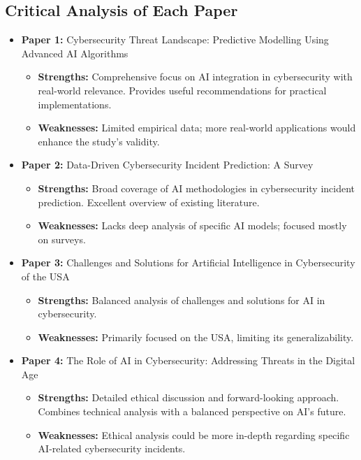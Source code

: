 \documentclass[12pt,a4paper]{article}
\begin{document}
\subsection{Critical Analysis of Each Paper}
\begin{itemize}
    \item \textbf{Paper 1:} Cybersecurity Threat Landscape: Predictive Modelling Using Advanced AI Algorithms \cite{Maddireddy2022}
    \begin{itemize}
        \item \textbf{Strengths:} Comprehensive focus on AI integration in cybersecurity with real-world relevance. Provides useful recommendations for practical implementations.
        \item \textbf{Weaknesses:} Limited empirical data; more real-world applications would enhance the study's validity.
    \end{itemize}
    
    \item \textbf{Paper 2:} Data-Driven Cybersecurity Incident Prediction: A Survey \cite{Sun2019}
    \begin{itemize}
        \item \textbf{Strengths:} Broad coverage of AI methodologies in cybersecurity incident prediction. Excellent overview of existing literature.
        \item \textbf{Weaknesses:} Lacks deep analysis of specific AI models; focused mostly on surveys.
    \end{itemize}

    \item \textbf{Paper 3:} Challenges and Solutions for Artificial Intelligence in Cybersecurity of the USA \cite{Soni2020}
    \begin{itemize}
        \item \textbf{Strengths:} Balanced analysis of challenges and solutions for AI in cybersecurity.
        \item \textbf{Weaknesses:} Primarily focused on the USA, limiting its generalizability.
    \end{itemize}
    
    \item \textbf{Paper 4:} The Role of AI in Cybersecurity: Addressing Threats in the Digital Age \cite{Camacho2024}
    \begin{itemize}
        \item \textbf{Strengths:} Detailed ethical discussion and forward-looking approach. Combines technical analysis with a balanced perspective on AI's future.
        \item \textbf{Weaknesses:} Ethical analysis could be more in-depth regarding specific AI-related cybersecurity incidents.
    \end{itemize}
\end{itemize}
\end{document}
